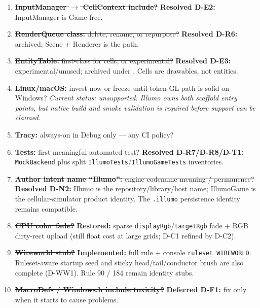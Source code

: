\begin{openbox}
\begin{enumerate}
        required module returned by the game's declarative factory; Engine
        knows only \texttt{IModule}.
  \item \sout{\textbf{InputManager $\rightarrow$ CellContext include?}}
        \textbf{Resolved D-E2:} InputManager is Game-free.
  \item \sout{\textbf{RenderQueue class:} delete, rename, or repurpose?}
        \textbf{Resolved D-R6:} archived; Scene + Renderer is the path.
  \item \sout{\textbf{EntityTable:} first-class for cells, or experimental?}
        \textbf{Resolved D-E3:} experimental/unused; archived under
        . Cells are drawables, not entities.

  \item \textbf{Linux/macOS:} invest now or freeze until token GL path is solid
        on Windows?
        \emph{Current status: unsupported. Illumo owns both scaffold entry
        points, but native build and smoke validation is required before support
        can be claimed.}
  \item \textbf{Tracy:} always-on in Debug only --- any CI policy?
  \item \sout{\textbf{Tests:} first meaningful automated test?}
        \textbf{Resolved D-R7/D-R8/D-T1:} \texttt{MockBackend} plus split
        \texttt{IllumoTests}/\texttt{IllumoGameTests} inventories.
  \item \sout{\textbf{Author intent name ``Illumo'':} engine codename meaning /
        permanence?}
        \textbf{Resolved D-N2:} Illumo is the repository/library/host name;
        IllumoGame is the cellular-simulator product identity. The
        \texttt{.illumo} persistence identity remains compatible.
  \item \sout{\textbf{CPU color fade?}}
        \textbf{Restored:} sparse \texttt{displayRgb}/\texttt{targetRgb} fade +
        RGB dirty-rect upload (still float cost at large grids; D-C1 refined by D-C2).
  \item \sout{\textbf{Wireworld stub?}}
        \textbf{Implemented:} full rule + console \texttt{ruleset WIREWORLD}.
        Ruleset-aware startup seed and sticky head/tail/conductor brush are
        also complete (D-WW1). Rule 90 / 184 remain identity stubs.
  \item \sout{\textbf{MacroDefs / Windows.h include toxicity?}}
        \textbf{Deferred D-F1:} fix only when it starts to cause problems.
\end{enumerate}
\end{openbox}
